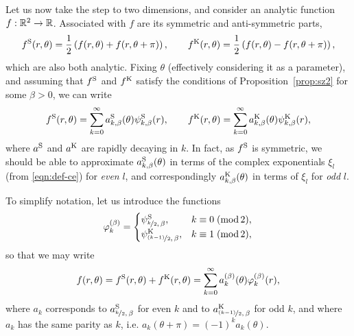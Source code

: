 Let us now take the step to two dimensions, and consider an analytic function $f:\mathbb{R}^2\to\mathbb{R}$. Associated
with $f$ are its symmetric and anti-symmetric parts,
\[
    f^{\mathrm{S}}(r,\theta) = \frac{1}{2}\left(f(r,\theta) + f(r,\theta+\pi)\right), \qquad
    f^{\mathrm{K}}(r,\theta) = \frac{1}{2}\left(f(r,\theta) - f(r,\theta+\pi)\right),
\]
which are also both analytic. Fixing $\theta$ (effectively considering it as a parameter), and assuming that
$f^{\mathrm{S}}$ and $f^{\mathrm{K}}$ satisfy the conditions of Proposition~\ref{prop:sz2} for some $\beta>0$, we can write
\[
    f^{\mathrm{S}}(r,\theta) = \sum_{k=0}^\infty a^{\mathrm{S}}_{k,\beta}(\theta) \psi^{\mathrm{S}}_{k,\beta}(r), \qquad
    f^{\mathrm{K}}(r,\theta) = \sum_{k=0}^\infty a^{\mathrm{K}}_{k,\beta}(\theta) \psi^{\mathrm{K}}_{k,\beta}(r),
\]
where $a^{\mathrm{S}}$ and $a^{\mathrm{K}}$ are rapidly decaying in $k$.  In fact, as $f^{\mathrm{S}}$ is symmetric, we should be able
to approximate $a^{\mathrm{S}}_{k,\beta}(\theta)$ in terms of the complex exponentials $\xi_l$ (from
\eqref{eqn:def-ce}) for {\em even} $l$, and correspondingly $a^{\mathrm{K}}_{k,\beta}(\theta)$ in terms of $\xi_l$ for
{\em odd} $l$.

To simplify notation, let us introduce the functions
\[
    \varphi_k^{(\beta)} = \begin{cases} 
        \psi^{\mathrm{S}}_{\nicefrac{k}{2},\,\beta}, & k \equiv 0\; (\operatorname{mod} 2), \\ 
        \psi^{\mathrm{K}}_{\nicefrac{(k-1)}{2},\,\beta}, & k \equiv 1\; (\operatorname{mod} 2),
    \end{cases}
\]
so that we may write
\[
    f(r,\theta) = f^{\mathrm{S}}(r,\theta) + f^{\mathrm{K}}(r,\theta) = 
    \sum_{k=0}^\infty a_k^{(\beta)}(\theta) \varphi_k^{(\beta)}(r),
\]
where $a_k$ corresponds to $a^{\mathrm{S}}_{\nicefrac{k}{2},\,\beta}$ for even $k$ and to
$a^{\mathrm{K}}_{\nicefrac{(k-1)}{2},\,\beta}$ for odd $k$, and where $a_k$ has the same parity as $k$, i.e.
$a_k(\theta+\pi) = (-1)^k a_k(\theta)$.

